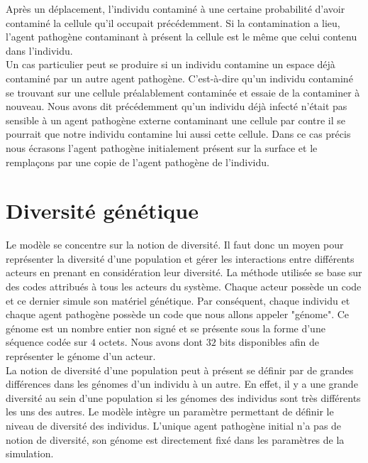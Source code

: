 Après un déplacement, l'individu contaminé à une certaine probabilité d'avoir contaminé la cellule qu'il occupait précédemment. Si la contamination a lieu, l'agent pathogène contaminant à présent la cellule est le même que celui contenu dans l'individu.\\

Un cas particulier peut se produire si un individu contamine un espace déjà contaminé par un autre agent pathogène. C'est-à-dire qu'un individu contaminé se trouvant sur une cellule préalablement contaminée et essaie de la contaminer à nouveau. Nous avons dit précédemment qu'un individu déjà infecté n'était pas sensible à un agent pathogène externe contaminant une cellule par contre il se pourrait que notre individu contamine lui aussi cette cellule. Dans ce cas précis nous écrasons l'agent pathogène initialement présent sur la surface et le remplaçons par une copie de l'agent pathogène de l'individu.

\section{Diversité génétique}

Le modèle se concentre sur la notion de diversité. Il faut donc un moyen pour représenter la diversité d'une population et gérer les interactions entre différents acteurs en prenant en considération leur diversité. La méthode utilisée se base sur des codes attribués à tous les acteurs du système. Chaque acteur possède un code et ce dernier simule son matériel génétique. Par conséquent, chaque individu et chaque agent pathogène possède un code que nous allons appeler "génome". Ce génome est un nombre entier non signé et se présente sous la forme d'une séquence codée sur $4$ octets. Nous avons dont $32$ bits disponibles afin de représenter le génome d'un acteur.\\

La notion de diversité d'une population peut à présent se définir par de grandes différences dans les génomes d'un individu à un autre. En effet, il y a une grande diversité au sein d'une population si les génomes des individus sont très différents les uns des autres. Le modèle intègre un paramètre permettant de définir le niveau de diversité des individus. L'unique agent pathogène initial n'a pas de notion de diversité, son génome est directement fixé dans les paramètres de la simulation.\\

